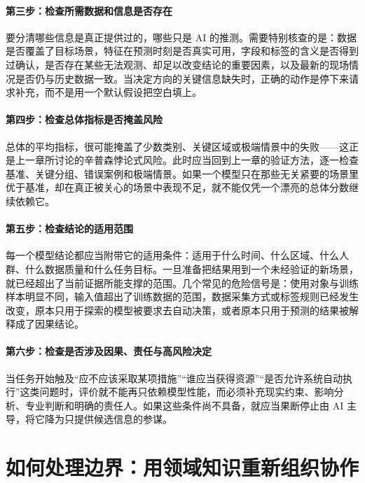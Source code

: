 \paragraph{第三步：检查所需数据和信息是否存在}
要分清哪些信息是真正提供过的，哪些只是 AI 的推测。需要特别核查的是：数据是否覆盖了目标场景，特征在预测时刻是否真实可用，字段和标签的含义是否得到过确认，是否存在某些无法观测、却足以改变结论的重要因素，以及最新的现场情况是否仍与历史数据一致。当决定方向的关键信息缺失时，正确的动作是停下来请求补充，而不是用一个默认假设把空白填上。

\paragraph{第四步：检查总体指标是否掩盖风险}
总体的平均指标，很可能掩盖了少数类别、关键区域或极端情景中的失败——这正是上一章所讨论的辛普森悖论式风险。此时应当回到上一章的验证方法，逐一检查基准、关键分组、错误案例和极端情景。如果一个模型只在那些无关紧要的场景里优于基准，却在真正被关心的场景中表现不足，就不能仅凭一个漂亮的总体分数继续依赖它。

\paragraph{第五步：检查结论的适用范围}
每一个模型结论都应当附带它的适用条件：适用于什么时间、什么区域、什么人群、什么数据质量和什么任务目标。一旦准备把结果用到一个未经验证的新场景，就已经超出了当前证据所能支撑的范围。几个常见的危险信号是：使用对象与训练样本明显不同，输入值超出了训练数据的范围，数据采集方式或标签规则已经发生改变，原本只用于探索的模型被要求去自动决策，或者原本只用于预测的结果被解释成了因果结论。

\paragraph{第六步：检查是否涉及因果、责任与高风险决定}
当任务开始触及“应不应该采取某项措施”“谁应当获得资源”“是否允许系统自动执行”这类问题时，评价就不能再只依赖模型性能，而必须补充现实约束、影响分析、专业判断和明确的责任人。如果这些条件尚不具备，就应当果断停止由 AI 主导，将它降为只提供候选信息的参谋。

\section{如何处理边界：用领域知识重新组织协作}

